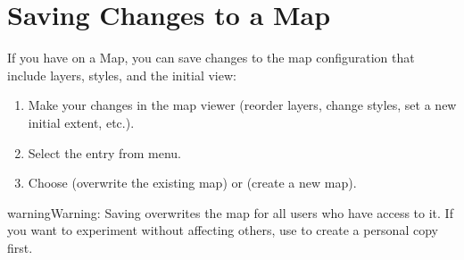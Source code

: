 \documentclass[letterpaper,10pt,english]{sphinxmanual}
\begin{document}
\section{Saving Changes to a Map}
\label{\detokenize{04_exploring_maps:saving-changes-to-a-map}}
\sphinxAtStartPar
If you have  on a Map, you can save changes to the map configuration that include  layers, styles, and
the initial view:
\begin{enumerate}
%
\item {} 
\sphinxAtStartPar
Make your changes in the map viewer (reorder layers, change styles, set a new
initial extent, etc.).

\item {} 
\sphinxAtStartPar
Select the  entry from  menu.

\item {} 
\sphinxAtStartPar
Choose  (overwrite the existing map) or  (create a new map).

\end{enumerate}

\begin{sphinxadmonition}{warning}{Warning:}
\sphinxAtStartPar
Saving overwrites the map for all users who have access to it.
If you want to experiment without affecting others, use  to create a
personal copy first.
\end{sphinxadmonition}
\end{document}
